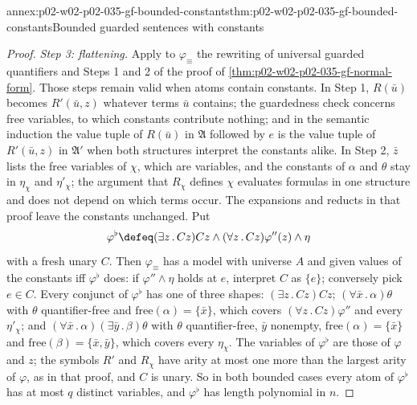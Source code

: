 \begin{annexitem}{annex:p02-w02-p02-035-gf-bounded-constants}{thm:p02-w02-p02-035-gf-bounded-constants}{Bounded guarded sentences with constants}
\begin{proof}
\emph{Step 3: flattening.}  Apply to \(\varphi_\equiv\) the rewriting of
universal guarded quantifiers and Steps 1 and 2 of the proof of
\cref{thm:p02-w02-p02-035-gf-normal-form}.  Those steps remain valid when
atoms contain constants.  In Step 1, \(R(\bar u)\) becomes \(R'(\bar u,z)\)
whatever terms \(\bar u\) contains; the guardedness check concerns free
variables, to which constants contribute nothing; and in the semantic
induction the value tuple of \(R(\bar u)\) in \(\mathfrak A\) followed by
\(e\) is the value tuple of \(R'(\bar u,z)\) in \(\mathfrak A'\) when both
structures interpret the constants alike.  In Step 2, \(\bar z\) lists the
free variables of \(\chi\), which are variables, and the constants of
\(\alpha\) and \(\theta\) stay in \(\eta_\chi\) and \(\eta'_\chi\); the argument
that \(R_\chi\) defines \(\chi\) evaluates formulas in one structure and does
not depend on which terms occur.  The expansions and reducts in that proof
leave the constants unchanged.  Put
\[
 \varphi^{\flat}\defeq(\exists z\,.\,Cz)Cz\land(\forall z\,.\,Cz)\varphi''(z)\land\eta
\]
with a fresh unary \(C\).  Then \(\varphi_\equiv\) has a model with universe
\(A\) and given values of the constants iff \(\varphi^{\flat}\) does: if
\(\varphi''\land\eta\) holds at \(e\), interpret \(C\) as \(\{e\}\); conversely
pick \(e\in C\).  Every conjunct of \(\varphi^{\flat}\) has one of three
shapes: \((\exists z\,.\,Cz)Cz\); \((\forall\bar x\,.\,\alpha)\theta\) with
\(\theta\) quantifier-free and \(\mathrm{free}(\alpha)=\{\bar x\}\), which covers
\((\forall z\,.\,Cz)\varphi''\) and every \(\eta'_\chi\); and
\((\forall\bar x\,.\,\alpha)(\exists\bar y\,.\,\beta)\theta\) with \(\theta\)
quantifier-free, \(\bar y\) nonempty, \(\mathrm{free}(\alpha)=\{\bar x\}\) and
\(\mathrm{free}(\beta)=\{\bar x,\bar y\}\), which covers every \(\eta_\chi\).
The variables of \(\varphi^{\flat}\) are those of \(\varphi\) and \(z\); the
symbols \(R'\) and \(R_\chi\) have arity at most one more than the largest
arity of \(\varphi\), as in that proof, and \(C\) is unary.  So in both
bounded cases every atom of \(\varphi^{\flat}\) has at most \(q\) distinct
variables, and \(\varphi^{\flat}\) has length polynomial in \(n\).


\end{proof}
\end{annexitem}
